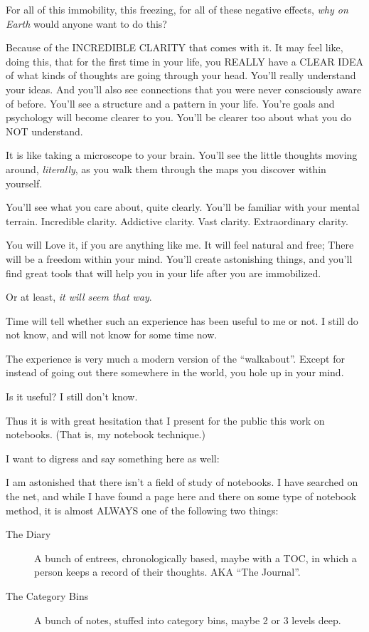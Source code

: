 \documentclass[oneside]{book}
\begin{document}
For all of this immobility, this freezing, for all of these negative
effects, \emph{why on Earth} would anyone want to do this?

Because of the INCREDIBLE CLARITY that comes with it. It may feel
like, doing this, that for the first time in your life, you REALLY
have a CLEAR IDEA of what kinds of thoughts are going through your
head. You'll really understand your ideas. And you'll also see
connections that you were never consciously aware of before. You'll
see a structure and a pattern in your life. You're goals and
psychology will become clearer to you. You'll be clearer too about
what you do NOT understand.

It is like taking a microscope to your brain. You'll see the little
thoughts moving around, \emph{literally}, as you walk them through the maps
you discover within yourself.

You'll see what you care about, quite clearly. You'll be familiar with
your mental terrain. Incredible clarity. Addictive clarity. Vast
clarity. Extraordinary clarity.

You will Love it, if you are anything like me. It will feel natural
and free; There will be a freedom within your mind. You'll create
astonishing things, and you'll find great tools that will help you in
your life after you are immobilized.

Or at least, \emph{it will seem that way}.

Time will tell whether such an experience has been useful to me or
not. I still do not know, and will not know for some time now.

The experience is very much a modern version of the
``walkabout''. Except for instead of going out there somewhere in the
world, you hole up in your mind.

Is it useful? I still don't know.

Thus it is with great hesitation that I present for the public this
work on notebooks. (That is, my notebook technique.)

I want to digress and say something here as well:

I am astonished that there isn't a field of study of notebooks. I have
searched on the net, and while I have found a page here and there on
some type of notebook method, it is almost ALWAYS one of the following
two things:

\begin{description}
\item[The Diary]
   A bunch of entrees, chronologically based, maybe with a TOC, in
   which a person keeps a record of their thoughts.
   AKA ``The Journal''.

\item[The Category Bins]
   A bunch of notes, stuffed into category bins, maybe 2 or 3 levels
   deep.
\end{description}
\end{document}
